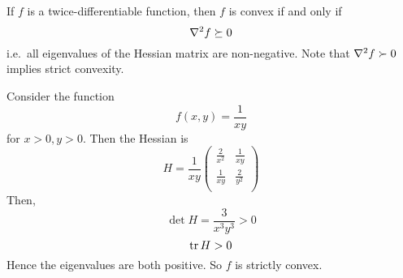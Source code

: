\begin{theorem}
	If \( f \) is a twice-differentiable function, then \( f \) is convex if and only if
	\[
		\laplacian{f} \succeq 0
	\]
	i.e.\ all eigenvalues of the Hessian matrix are non-negative.
	Note that \( \laplacian{f} \succ 0 \) implies strict convexity.
\end{theorem}

\begin{example}
	Consider the function
	\[
		f(x,y) = \frac{1}{xy}
	\]
	for \( x > 0, y > 0 \).
	Then the Hessian is
	\[
		H = \frac{1}{xy}\begin{pmatrix}
			\frac{2}{x^2} & \frac{1}{xy}  \\
			\frac{1}{xy}  & \frac{2}{y^2} \\
		\end{pmatrix}
	\]
	Then,
	\[
		\det H = \frac{3}{x^3 y^3} > 0
	\]
	\[
		\tr H > 0
	\]
	Hence the eigenvalues are both positive.
	So \( f \) is strictly convex.
\end{example}

